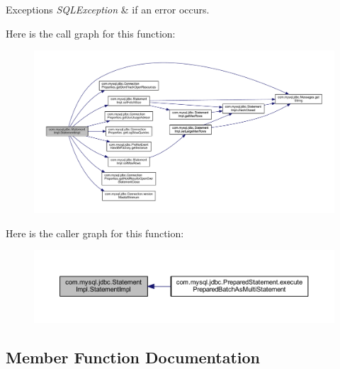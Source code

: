 \begin{DoxyExceptions}{Exceptions}
{\em S\+Q\+L\+Exception} & if an error occurs. \\
\hline
\end{DoxyExceptions}
Here is the call graph for this function\+:
\nopagebreak
\begin{figure}[H]
\begin{center}
\leavevmode
\includegraphics[width=350pt]{classcom_1_1mysql_1_1jdbc_1_1_statement_impl_a2d3783c9f776e2eb863b449b21825b4d_cgraph}
\end{center}
\end{figure}
Here is the caller graph for this function\+:
\nopagebreak
\begin{figure}[H]
\begin{center}
\leavevmode
\includegraphics[width=350pt]{classcom_1_1mysql_1_1jdbc_1_1_statement_impl_a2d3783c9f776e2eb863b449b21825b4d_icgraph}
\end{center}
\end{figure}


\subsection{Member Function Documentation}
\mbox{\label{classcom_1_1mysql_1_1jdbc_1_1_statement_impl_a3ea3c4f24a3d1c9d4f9f9a9d29e53a02}} 

